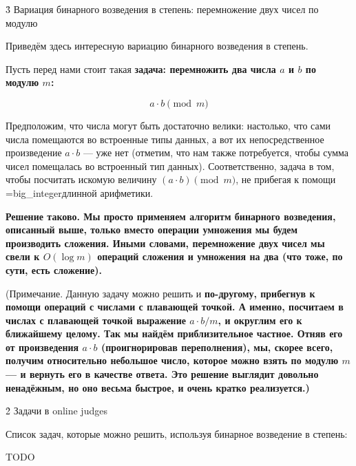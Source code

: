 \h3{ Вариация бинарного возведения в степень: перемножение двух чисел по модулю }

Приведём здесь интересную вариацию бинарного возведения в степень.

Пусть перед нами стоит такая \bf{задача}: перемножить два числа $a$ и $b$ по модулю $m$:

$$ a \cdot b \pmod m $$

Предположим, что числа могут быть достаточно велики: настолько, что сами числа помещаются во встроенные типы данных, а вот их непосредственное произведение $a \cdot b$ --- уже нет (отметим, что нам также потребуется, чтобы сумма чисел помещалась во встроенный тип данных). Соответственно, задача в том, чтобы посчитать искомую величину $(a \cdot b) \pmod m$, не прибегая к помощи \algohref=big_integer{длинной арифметики}.

\bf{Решение} таково. Мы просто применяем алгоритм бинарного возведения, описанный выше, только вместо операции умножения мы будем производить сложения. Иными словами, перемножение двух чисел мы свели к $O (\log m)$ операций сложения и умножения на два (что тоже, по сути, есть сложение).

(Примечание. Данную задачу можно решить и \bf{по-другому}, прибегнув к помощи операций с числами с плавающей точкой. А именно, посчитаем в числах с плавающей точкой выражение $a \cdot b / m$, и округлим его к ближайшему целому. Так мы найдём \bf{приблизительное} частное. Отняв его от произведения $a \cdot b$ (проигнорировав переполнения), мы, скорее всего, получим относительно небольшое число, которое можно взять по модулю $m$ --- и вернуть его в качестве ответа. Это решение выглядит довольно ненадёжным, но оно весьма быстрое, и очень кратко реализуется.)



\h2{ Задачи в online judges }

Список задач, которые можно решить, используя бинарное возведение в степень:

TODO

